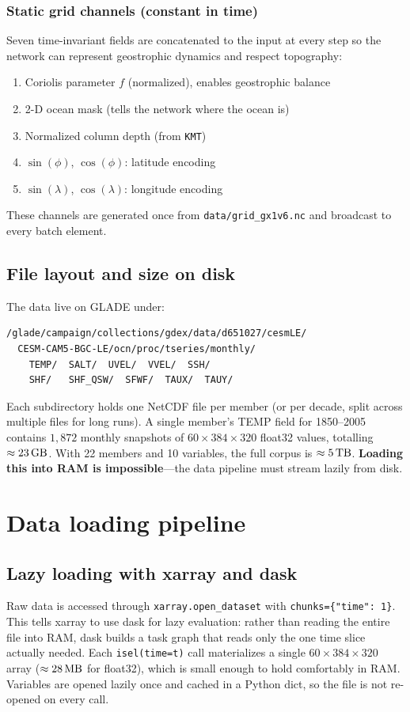 \documentclass[11pt]{article}
\begin{document}
\subsubsection{Static grid channels (constant in time)}
Seven time-invariant fields are concatenated to the input at every step so the
network can represent geostrophic dynamics and respect topography:
\begin{enumerate}[itemsep=1pt]
  \item Coriolis parameter $f$ (normalized), enables geostrophic balance
  \item 2-D ocean mask (tells the network where the ocean is)
  \item Normalized column depth (from \texttt{KMT})
  \item $\sin(\phi)$, $\cos(\phi)$: latitude encoding
  \item $\sin(\lambda)$, $\cos(\lambda)$: longitude encoding
\end{enumerate}
These channels are generated once from \texttt{data/grid\_gx1v6.nc} and
broadcast to every batch element.

\subsection{File layout and size on disk}
The data live on GLADE under:
\begin{lstlisting}
/glade/campaign/collections/gdex/data/d651027/cesmLE/
  CESM-CAM5-BGC-LE/ocn/proc/tseries/monthly/
    TEMP/  SALT/  UVEL/  VVEL/  SSH/
    SHF/   SHF_QSW/  SFWF/  TAUX/  TAUY/
\end{lstlisting}
Each subdirectory holds one NetCDF file per member (or per decade, split across
multiple files for long runs). A single member's TEMP field for 1850--2005
contains $1{,}872$ monthly snapshots of $60\times384\times320$ float32 values,
totalling $\approx\SI{23}{\giga\byte}$. With 22 members and 10 variables, the
full corpus is $\approx\SI{5}{\tera\byte}$. \textbf{Loading this into RAM is
impossible}---the data pipeline must stream lazily from disk.

\section{Data loading pipeline}
\label{sec:dataload}

\subsection{Lazy loading with xarray and dask}
Raw data is accessed through \texttt{xarray.open\_dataset} with
\texttt{chunks=\{"time": 1\}}. This tells xarray to use dask for lazy
evaluation: rather than reading the entire file into RAM, dask builds a task
graph that reads only the one time slice actually needed. Each \texttt{isel(time=t)} call materializes a single $60\times384\times320$ array
($\approx\SI{28}{\mega\byte}$ for float32), which is small enough to hold
comfortably in RAM. Variables are opened lazily once and cached in a Python
dict, so the file is not re-opened on every call.
\end{document}
